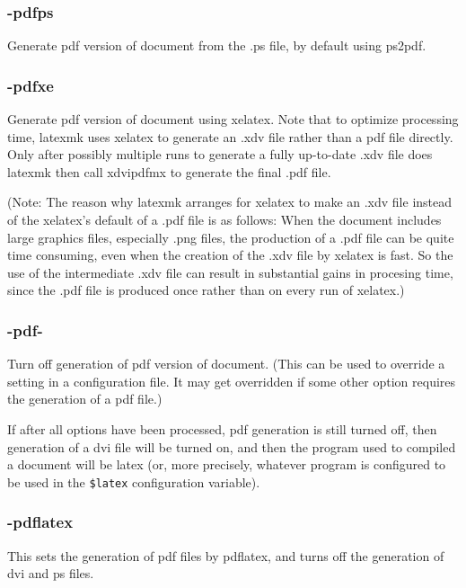 \subsubsection{-pdfps}

Generate  pdf  version of document from the .ps file, by default
using ps2pdf.


\subsubsection{-pdfxe}

Generate pdf version of document using xelatex.   Note  that  to optimize
processing  time,  latexmk uses xelatex to generate an .xdv file rather than a
pdf file directly.  Only after  possibly multiple  runs to generate a fully
up-to-date .xdv file does latexmk then call xdvipdfmx to generate the final
.pdf file.

(Note: The reason why latexmk arranges for xelatex  to  make  an .xdv  file
instead of the xelatex's default of a .pdf file is as follows: When the
document includes large graphics files,  especially  .png  files,  the
production of a .pdf file can be quite time consuming, even when the creation
of the .xdv file by xelatex  is  fast.  So the use of the intermediate .xdv
file can result in substantial gains in procesing time, since the .pdf file
is produced once rather than on every run of xelatex.)


\subsubsection{-pdf-}

Turn  off  generation  of pdf version of document.  (This can be used to
override a setting in a configuration file.  It may  get overridden if some
other option requires the generation of a pdf file.)

If after all options have  been  processed,  pdf  generation  is still  turned
off, then generation of a dvi file will be turned on, and then the program used
to compiled a document will be latex  (or,  more  precisely, whatever program
is configured to be used in the \verb|$latex| configuration variable).


\subsubsection{-pdflatex}

This sets the generation of pdf files by pdflatex, and turns off
the generation of dvi and ps files.

